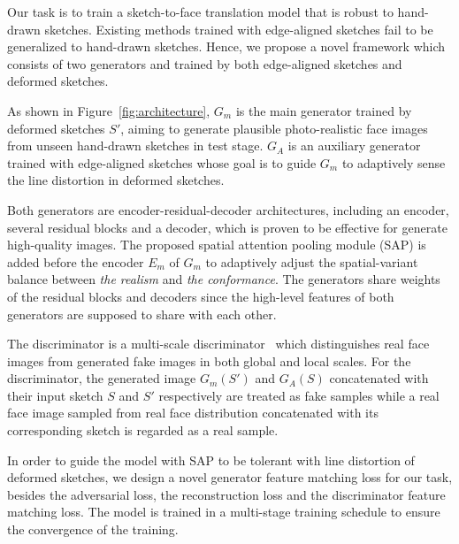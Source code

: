 % 

Our task is to train a sketch-to-face translation model that is robust to hand-drawn sketches. Existing methods trained with edge-aligned sketches fail to be generalized to hand-drawn sketches. Hence, we propose a novel framework which consists of two generators and trained by both edge-aligned sketches and deformed sketches.

As shown in Figure~\ref{fig:architecture}, $G_m$ is the main generator trained by deformed sketches $S'$, aiming to generate plausible photo-realistic face images from unseen hand-drawn sketches in test stage. 
$G_A$ is an auxiliary generator trained with edge-aligned sketches whose goal is to guide $G_m$ to adaptively sense the line distortion in deformed sketches.

Both generators are encoder-residual-decoder architectures, including an encoder, several residual blocks and a decoder, which is proven to be effective for generate high-quality images. 
The proposed spatial attention pooling module (SAP) is added before the encoder $E_m$ of $G_m$ to adaptively adjust the spatial-variant balance between \textit{the realism} and \textit{the conformance}. 
The generators share weights of the residual blocks and decoders since the high-level features of both generators are supposed to share with each other.


%
The discriminator is a multi-scale discriminator~\cite{pix2pixHD} which distinguishes real face images from generated fake images in both global and local scales.
For the discriminator, the generated image $G_m(S')$ and $G_A(S)$ concatenated with their input sketch $S$ and $S'$ respectively are treated as fake samples while a real face image sampled from real face distribution concatenated with its corresponding sketch is regarded as a real sample. 
%

In order to guide the model with SAP to be tolerant with line distortion of deformed sketches, we design a novel generator feature matching loss for our task, besides the adversarial loss, the reconstruction loss and the discriminator feature matching loss. The model is trained in a multi-stage training schedule to ensure the convergence of the training.
%

